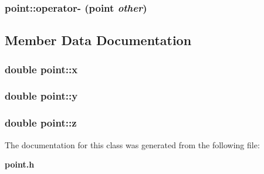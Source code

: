 \subsubsection[{operator-}]{ point::operator- ({\bf point} {\em other})}\label{classpoint_1efc2cc82a2d7d73323d20da6e70de2f}




\subsection{Member Data Documentation}
\subsubsection[{x}]{\setlength{\rightskip}{0pt plus 5cm}double {\bf point::x}}\label{classpoint_9c6b34deaf4900ad4193c17935fd384a}


\subsubsection[{y}]{\setlength{\rightskip}{0pt plus 5cm}double {\bf point::y}}\label{classpoint_613f8f0d7352731638b0094e1b958b87}


\subsubsection[{z}]{\setlength{\rightskip}{0pt plus 5cm}double {\bf point::z}}\label{classpoint_ab1f0c3682401083b5bf252e7001874f}




The documentation for this class was generated from the following file:\begin{CompactItemize}
\item 
{\bf point.h}\end{CompactItemize}
